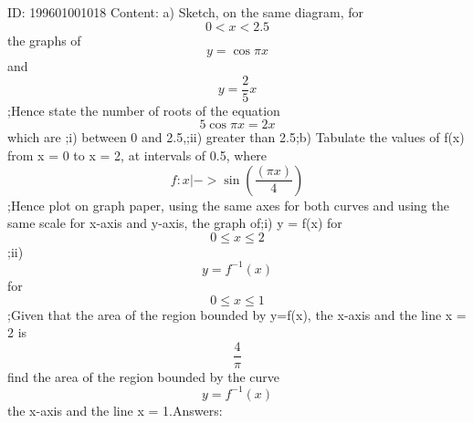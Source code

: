 \documentclass{article}
\begin{document}
ID: 199601001018
Content:
a) Sketch, on the same diagram, for \[0< x< 2.5\] the graphs of \[y=\cos \pi x\] and \[y=\frac{2}{5}x\] ;Hence state the number of roots of the equation \[5\cos \pi x = 2x\] which are ;i) between 0 and 2.5,;ii) greater than 2.5;b) Tabulate the values of f(x) from x = 0 to x = 2, at intervals of 0.5, where \[f:x|->\sin (\frac{(\pi x)}{4})\] ;Hence plot on graph paper, using the same axes for both curves and using the same scale for x-axis and y-axis, the graph of;i) y = f(x) for \[0\leq x\leq 2\] ;ii) \[y = f^{-1}(x)\] for \[0\leq x\leq 1\] ;Given that the area of the region bounded by y=f(x), the x-axis and the line x = 2 is \[\frac{4}{\pi}\] find the area of the region bounded by the curve \[y=f^{-1}(x)\] the x-axis and the line x = 1.Answers:
\end{document}
